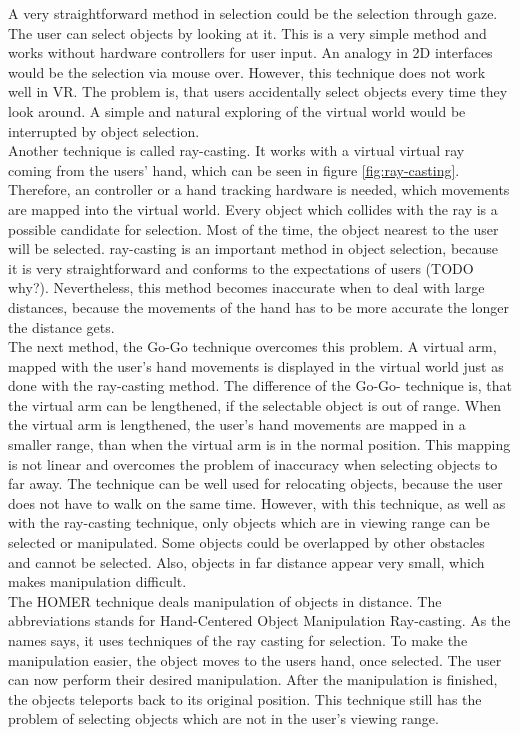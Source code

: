 A very straightforward method in selection could be the selection through gaze. The user can select objects by looking at it. This is a very simple method and works without hardware controllers for user input. An analogy in 2D interfaces would be the selection via mouse over. However, this technique does not work well in VR. The problem is, that users accidentally select objects every time they look around. A simple and natural exploring of the virtual world would be interrupted by object selection.\\
Another technique is called ray-casting. It works with a virtual virtual ray coming from the users' hand, which can be seen in figure \ref{fig:ray-casting}. Therefore, an controller or a hand tracking hardware is needed, which movements are mapped into the virtual world. Every object which collides with the ray is a possible candidate for selection. Most of the time, the object nearest to the user will be selected. ray-casting is an important method in object selection, because it is very straightforward and conforms to the expectations of users (TODO why?). Nevertheless, this method becomes inaccurate when to deal with large distances, because the movements of the hand has to be more accurate the longer the distance gets. \\
The next method, the Go-Go technique overcomes this problem. A virtual arm, mapped with the user's hand movements is displayed in the virtual world just as done with the ray-casting method. The difference of the Go-Go- technique is, that the virtual arm can be lengthened, if the selectable object is out of range. When the virtual arm is lengthened, the user's hand movements are mapped in a smaller range, than when the virtual arm is in the normal position. This mapping is not linear and overcomes the problem of inaccuracy when selecting objects to far away. The technique can be well used for relocating objects, because the user does not have to walk on the same time. However, with this technique, as well as with the ray-casting technique, only objects which are in viewing range can be selected or manipulated. Some objects could be overlapped by other obstacles and cannot be selected. Also, objects in far distance appear very small, which makes manipulation difficult.\\
The HOMER technique deals manipulation of objects in distance. The abbreviations stands for Hand-Centered Object Manipulation Ray-casting. As the names says, it uses techniques of the ray casting for selection. To make the manipulation easier, the object moves to the users hand, once selected. The user can now perform their desired manipulation. After the manipulation is finished, the objects teleports back to its original position. This technique still has the problem of selecting objects which are not in the user's viewing range.\\
